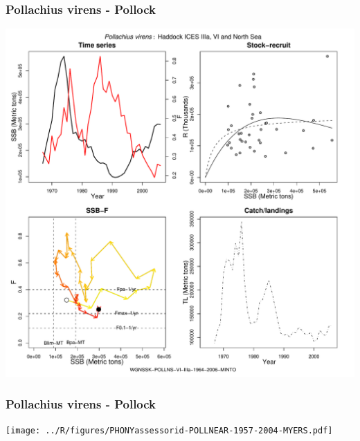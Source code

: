 \subsubsection{Pollachius virens - Pollock}
\begin{center}
\includegraphics[width=1.2\textwidth]{../R/figures/WGNSSK-POLLNS-VI-IIIa-1964-2006-MINTO.pdf}
\end{center}

\subsubsection{Pollachius virens - Pollock}
\begin{center}
\texttt{[image: ../R/figures/PHONYassessorid-POLLNEAR-1957-2004-MYERS.pdf]}
\end{center}

